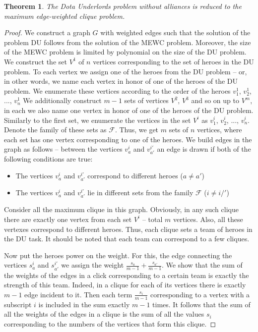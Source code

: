 \documentclass{article}
\newtheorem{theorem}{Theorem}
\begin{document}
\begin{theorem}
\label{trivial_case}
    The Dota Underlords problem without alliances is reduced to the  maximum edge-weighted clique problem.
\end{theorem}
\begin{proof}
    
   We construct a graph $G$ with weighted edges such that the solution of the problem DU follows from the solution of the MEWC problem. Moreover, the size of the MEWC problem is limited by polynomial on the size of the DU problem.
    We construct the set $V^1 $ of $n$ vertices corresponding to the set of heroes in the DU problem. To each vertex we assign one of the heroes from the DU problem -- or, in other words, we name each vertex in honor of one of the heroes of the DU problem. We enumerate these vertices according to the order of the heroes $v_1^1$, $v_2^1$, ..., $ v_n^1$
    We additionally construct $m-1$ sets of vertices $ V^2 $, $ V^3 $ and so on up to $ V^m $, in each we also name one vertex in honor of one of the heroes of the DU problem. Similarly to the first set, we enumerate the vertices in the set $V^i $ as $ v_1^i $, $v_2^i$, ..., $v_n^i$.
    Denote the family of these sets as $ \mathcal{F} $. Thus, we get $m$ sets of $n$ vertices, where each set has one vertex corresponding to one of the heroes.
   We build edges in the graph as follows --  between the vertices $v_a^i $ and $v_{a'}^{i'} $ an edge is drawn if both of the following conditions are true:
    \begin{itemize}
        \item The vertices $v_a^i $ and $v_{a'}^{i'} $ correspond to different heroes ($a \neq a'$)
        \item The vertices $v_a^i $ and $v_{a'}^{i'} $ lie in different sets from the family $\mathcal{F}$ ($ i \neq i /'$)
    \end{itemize}

    Consider all the maximum clique in this graph. Obviously, in any such clique there are exactly one vertex from each set $ V^i $ -- total $m$ vertices. Also, all these vertexes correspond to different heroes. Thus, each clique sets a team of heroes in the DU task. It should be noted that each team can correspond to a few cliques.
  
    Now put the heroes power on the weight. For this, the edge connecting the vertices $s_a^i$ and $s_ {a'}^{i'}$ we assign the weight $ \frac{s_a}{m-1} + \frac{s_{a '}}{m-1}$. We show that the sum of the weights of the edges in a click corresponding to a certain team is exactly the strength of this team.
    Indeed, in a clique for each of its vertices there is exactly $m-1$ edge incident to it. Then each term $\frac{s_i}{m-1}$ corresponding to a vertex with a subscript $i$ is included in the sum exactly $m-1$ times. It follows that the sum of all the weights of the edges in a clique is the sum 
of all the values $s_i$ corresponding to the numbers of the vertices that form this clique.      
\end{proof}
\end{document}

